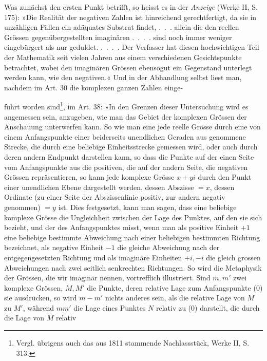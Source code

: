 Was zunächst den ersten Punkt betrifft, so heisst es in der \textit{Anzeige}
(Werke II, S. 175): »Die Realität der negativen Zahlen ist hinreichend gerechtfertigt,
da sie in unzähligen Fällen ein adäquates Substrat findet, .\ .\ . allein
die den reellen Grössen gegenübergestellten imaginären .\ .\ .\ . sind noch immer
weniger eingebürgert als nur geduldet. .\ .\ .\ . Der Verfasser hat diesen hochwichtigen
Teil der Mathematik seit vielen Jahren aus einem verschiedenen
Gesichtspunkte betrachtet, wobei den imaginären Grössen ebensogut ein Gegenstand
unterlegt werden kann, wie den negativen.« Und in der Abhandlung
selbst liest man, nachdem im Art. 30 die komplexen ganzen Zahlen einge-\par
\clearpage{}
\noindent führt worden sind\footnote{Vergl. übrigens auch das aus 1811 stammende Nachlassstück, Werke II, S. 313.}, im Art. 38: »In den Grenzen dieser Untersuchung wird
es angemessen sein, anzugeben, wie man das Gebiet der komplexen Grössen
der Anschauung unterwerfen kann. So wie man eine jede reelle Grösse durch
eine von einem Anfangspunkte einer beiderseits unendlichen Geraden aus genommene
Strecke, die durch eine beliebige Einheitsstrecke gemessen wird,
oder auch durch deren andern Endpunkt darstellen kann, so dass die Punkte
auf der einen Seite vom Anfangspunkte aus die positiven, die auf der andern
Seite, die negativen Grössen repräsentieren, so kann jede komplexe Grösse
\(x+yi\) durch den Punkt einer unendlichen Ebene dargestellt werden, dessen
Abszisse \(=x\), dessen Ordinate (zu einer Seite der Abszissenlinie positiv, zur
andern negativ genommen) \(=y\) ist. Dies festgesetzt, kann man sagen, dass
eine beliebige komplexe Grösse die Ungleichheit zwischen der Lage des Punktes,
auf den sie sich bezieht, und der des Anfangspunktes misst, wenn man als
positive Einheit \(+1\) eine beliebige bestimmte Abweichung nach einer beliebigen
bestimmten Richtung bezeichnet, als negative Einheit \(-1\) die gleiche
Abweichung nach der entgegengesetzten Richtung und als imaginäre Einheiten
\(+i,-i\) die gleich grossen Abweichungen nach zwei seitlich senkrechten Richtungen.
So wird die Metaphysik der Grössen, die wir imaginär nennen, vortrefflich
illustriert. Sind \(m,m'\) zwei komplexe Grössen, \(M,M'\) die Punkte,
deren relative Lage zum Anfangspunkte (0) sie ausdrücken, so wird \(m-m'\)
nichts anderes sein, als die relative Lage von \(M\) zu \(M'\), während \(mm'\) die
Lage eines Punktes \(N\) relativ zu (0) darstellt, die durch die Lage von \(M\) relativ
